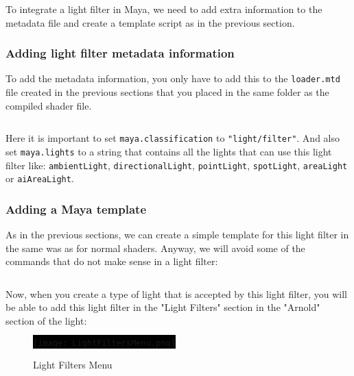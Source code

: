 To integrate a light filter in Maya, we need to add extra information to the
metadata file and create a template script as in the previous section.

\subsubsection{Adding light filter metadata information}

To add the metadata information, you only have to add this to the \texttt{loader.mtd} file created in the
previous sections that you placed in the same folder as the compiled shader file.

\inputminted[mathescape,
linenos,
numbersep=5pt,
frame=lines,
framesep=2mm,
baselinestretch=1,
fontsize=\footnotesize,
tabsize=3,
label=loader.mtd,
firstline=101,
firstnumber=101]
{mtd}{loader3.mtd}

Here it is important to set \texttt{maya.classification} to \texttt{"light/filter"}. And also
set \texttt{maya.lights} to a string that contains all the lights that can use this light filter
like: \texttt{ambientLight}, \texttt{directionalLight}, \texttt{pointLight},
\texttt{spotLight}, \texttt{areaLight} or \texttt{aiAreaLight}.

\subsubsection{Adding a Maya template}

As in the previous sections, we can create a simple template for this light filter in the same was as for
normal shaders. Anyway, we will avoid some of the commands that do not make sense in a light filter:

\inputminted[mathescape,
linenos,
numbersep=5pt,
frame=lines,
framesep=2mm,
baselinestretch=1,
fontsize=\footnotesize,
tabsize=3,
label=aiSimpleLightFilterTemplate.py]
{python}{aiSimpleLightFilterTemplate.py}

Now, when you create a type of light that is accepted by this light filter, you will be able to
add this light filter in the "Light Filters" section in the "Arnold" section of the light:

\begin{figure}[H]
\centering
\colorbox{black}{\texttt{[image: LightFiltersMenu.png]}}
\caption{Light Filters Menu}
\label{LightFiltersMenu}
\end{figure}





